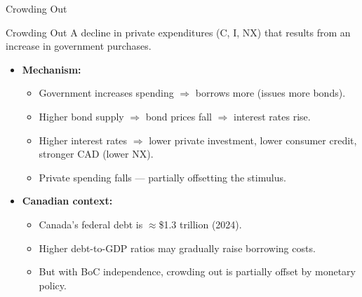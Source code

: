 \documentclass[aspectratio=169]{beamer}
\begin{document}
\begin{frame}{Crowding Out}
\transfade
\begin{block}{Crowding Out}
A decline in private expenditures (C, I, NX) that results from an increase in government purchases.
\end{block}
\begin{itemize}
  \item \textbf{Mechanism:}
  \begin{itemize}
    \item Government increases spending $\Rightarrow$ borrows more (issues more bonds).
    \item Higher bond supply $\Rightarrow$ bond prices fall $\Rightarrow$ interest rates rise.
    \item Higher interest rates $\Rightarrow$ lower private investment, lower consumer credit, stronger CAD (lower NX).
    \item Private spending falls --- partially offsetting the stimulus.
  \end{itemize}
  \item \textbf{Canadian context:}
  \begin{itemize}
    \item Canada's federal debt is $\approx$\$1.3 trillion (2024).
    \item Higher debt-to-GDP ratios may gradually raise borrowing costs.
    \item But with BoC independence, crowding out is partially offset by monetary policy.
  \end{itemize}
\end{itemize}
\end{frame}
\end{document}
